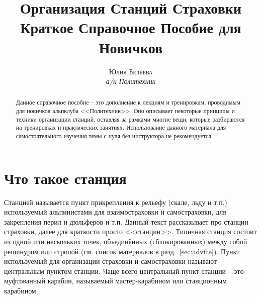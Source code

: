 \documentclass[fleqn, 12pt]{extarticle}
\begin{document}

\title{\textbf{Организация Станций Страховки}\\
\large{Краткое Справочное Пособие для Новичков}}
\author{\textsc{Юлия Беляева}\\\textit{а/к Политехник}}
\date{\GITAuthorDate}

\maketitle

\begin{abstract}
	Данное справочное пособие -- это дополнение к лекциям и тренировкам, проводимым для новичков альпклуба <<Политехник>>. Оно описывает некоторые принципы и техники организации станций,
	оставляя за рамками многие вещи, которые разбираются на тренировках и практических занятиях. Использование данного материала для самостоятельного изучения темы с нуля без инструктора не
	рекомендуется.
\end{abstract}

\section{Что такое станция}
Станцией называется пункт прикрепления к рельефу (скале, льду и т.п.) используемый альпинистами для взаимостраховки и самостраховки, для
закрепления перил и дюльферов и т.п. Данный текст рассказывает про станции страховки, далее для краткости просто <<станции>>. Типичная станция состоит из одной или нескольких точек,
объединённых (сблокированных) между собой репшнуром или стропой (см. список материалов в разд.~\ref{sec:advice}). Пункт используемый для организации страховки и
самостраховки называют центральным пунктом станции.
Чаще всего центральный пункт станции -- это муфтованный карабин, называемый мастер-карабином или станционным карабином.
\end{document}
